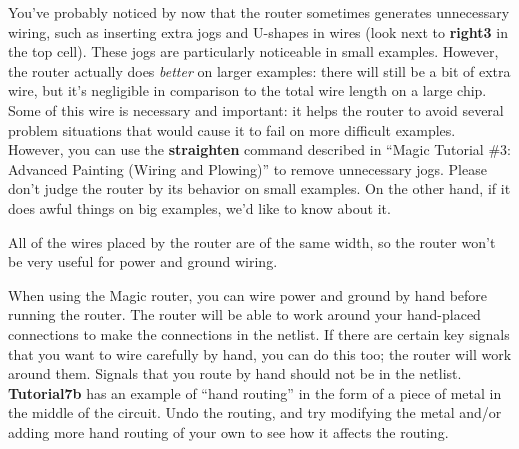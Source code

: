 \documentclass[letterpaper,twoside,12pt]{article}
\begin{document}
You've probably noticed by now that the router sometimes
generates unnecessary wiring, such as inserting extra
jogs and U-shapes in wires (look next to  {\bfseries right3} in
the top cell).  These jogs are particularly noticeable in small examples.
However, the router actually does {\itshape better} on larger
examples:  there will still be a bit of extra wire, but it's
negligible in comparison to the total wire length on a large
chip.  
Some of this wire is necessary and important: 
it helps the router to avoid several problem situations that would cause
it to fail on more difficult examples.
However, you can use the {\bfseries straighten} command described
in ``Magic Tutorial \#3: Advanced Painting (Wiring and Plowing)''
to remove unnecessary jogs.
Please don't judge the
router by its behavior on small examples.  On the other hand, if
it does awful things on big examples, we'd like to know about it.

All of the wires placed by the router are of the same width,
so the router won't be very useful for power and ground wiring.

When using the Magic router,
you can wire power and ground by hand before
running the router.  The router will be able to work around
your hand-placed connections to make the connections in the
netlist.  If there are certain key signals that you want to
wire carefully by hand, you can do this too;  the router will
work around them.  Signals that you route by hand should not
be in the netlist.  {\bfseries Tutorial7b} has an example of ``hand
routing'' in the form of a piece of metal in the middle of
the circuit.  Undo the routing, and try modifying the metal
and/or adding more hand
routing of your own to see how it affects the routing.
\end{document}
